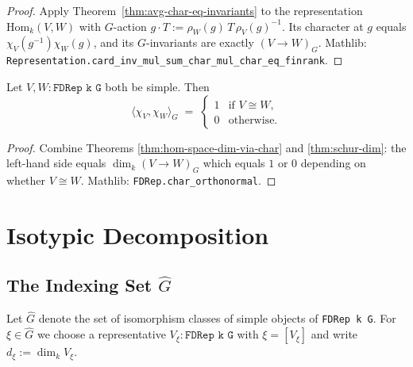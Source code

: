 \begin{proof}
  \leanok
  Apply Theorem~\ref{thm:avg-char-eq-invariants} to the representation
  $\mathrm{Hom}_k(V, W)$ with $G$-action $g \cdot T := \rho_W(g)\, T\, \rho_V(g)^{-1}$.
  Its character at $g$ equals $\chi_V(g^{-1})\chi_W(g)$, and its
  $G$-invariants are exactly $(V \to W)_G$. Mathlib:
  \texttt{Representation.card\_inv\_mul\_sum\_char\_mul\_char\_eq\_finrank}.
\end{proof}

\begin{theorem}
  \label{thm:char-ortho}
  \mathlibok
  Let $V, W : \texttt{FDRep k G}$ both be simple. Then
  \[
    \langle \chi_V, \chi_W \rangle_G \;=\;
    \begin{cases} 1 & \text{if } V \cong W,\\ 0 & \text{otherwise.}\end{cases}
  \]
\end{theorem}

\begin{proof}
  \leanok
  Combine Theorems \ref{thm:hom-space-dim-via-char} and \ref{thm:schur-dim}:
  the left-hand side equals $\dim_k(V \to W)_G$ which equals $1$ or $0$
  depending on whether $V \cong W$. Mathlib: \texttt{FDRep.char\_orthonormal}.
\end{proof}


\chapter{Isotypic Decomposition}
\label{chap:isotypic}

\section{The Indexing Set $\hat G$}

\begin{definition}
  \label{def:Ghat}
  Let $\hat G$ denote the set of isomorphism classes of simple objects of
  \texttt{FDRep k G}. For $\xi \in \hat G$ we choose a representative
  $V_\xi : \texttt{FDRep k G}$ with $\xi = [V_\xi]$ and write
  $d_\xi := \dim_k V_\xi$.
\end{definition}

